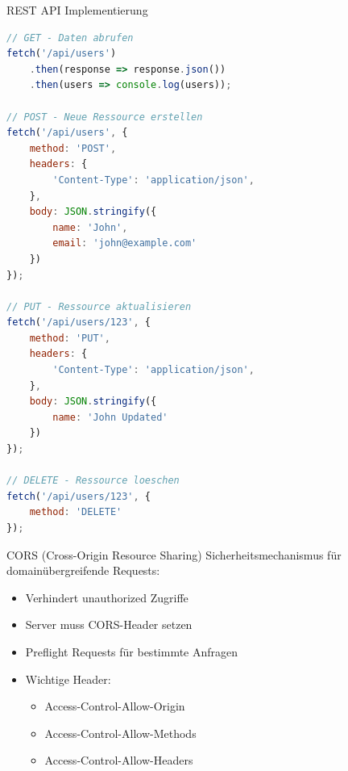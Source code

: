 \begin{KR}{REST API Implementierung}
\begin{lstlisting}[language=JavaScript, style=basesmol]
// GET - Daten abrufen
fetch('/api/users')
    .then(response => response.json())
    .then(users => console.log(users));

// POST - Neue Ressource erstellen
fetch('/api/users', {
    method: 'POST',
    headers: {
        'Content-Type': 'application/json',
    },
    body: JSON.stringify({
        name: 'John',
        email: 'john@example.com'
    })
});

// PUT - Ressource aktualisieren
fetch('/api/users/123', {
    method: 'PUT',
    headers: {
        'Content-Type': 'application/json',
    },
    body: JSON.stringify({
        name: 'John Updated'
    })
});

// DELETE - Ressource loeschen
fetch('/api/users/123', {
    method: 'DELETE'
});
\end{lstlisting}
\end{KR}

\begin{concept}{CORS (Cross-Origin Resource Sharing)}
    Sicherheitsmechanismus für domainübergreifende Requests:
    \begin{itemize}
        \item Verhindert unauthorized Zugriffe
        \item Server muss CORS-Header setzen
        \item Preflight Requests für bestimmte Anfragen
        \item Wichtige Header:
            \begin{itemize}
                \item Access-Control-Allow-Origin
                \item Access-Control-Allow-Methods
                \item Access-Control-Allow-Headers
            \end{itemize}
    \end{itemize}
\end{concept}

